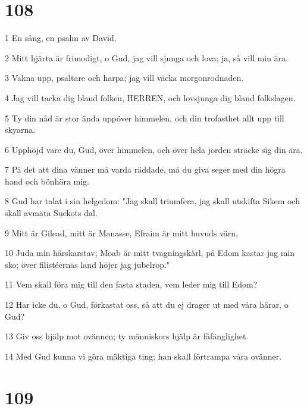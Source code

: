 \chapter{108}

\par 1 En sång, en psalm av David.
\par 2 Mitt hjärta är frimodigt, o Gud, jag vill sjunga och lova; ja, så vill min ära.
\par 3 Vakna upp, psaltare och harpa; jag vill väcka morgonrodnaden.
\par 4 Jag vill tacka dig bland folken, HERREN, och lovsjunga dig bland folkslagen.
\par 5 Ty din nåd är stor ända uppöver himmelen, och din trofasthet allt upp till skyarna.
\par 6 Upphöjd vare du, Gud, över himmelen, och över hela jorden sträcke sig din ära.
\par 7 På det att dina vänner må varda räddade, må du giva seger med din högra hand och bönhöra mig.
\par 8 Gud har talat i sin helgedom: "Jag skall triumfera, jag skall utskifta Sikem och skall avmäta Suckots dal.
\par 9 Mitt är Gilead, mitt är Manasse, Efraim är mitt huvuds värn,
\par 10 Juda min härskarstav; Moab är mitt tvagningskärl, på Edom kastar jag min sko; över filistéernas land höjer jag jubelrop."
\par 11 Vem skall föra mig till den fasta staden, vem leder mig till Edom?
\par 12 Har icke du, o Gud, förkastat oss, så att du ej drager ut med våra härar, o Gud?
\par 13 Giv oss hjälp mot ovännen; ty människors hjälp är fåfänglighet.
\par 14 Med Gud kunna vi göra mäktiga ting; han skall förtrampa våra ovänner.

\chapter{109}

